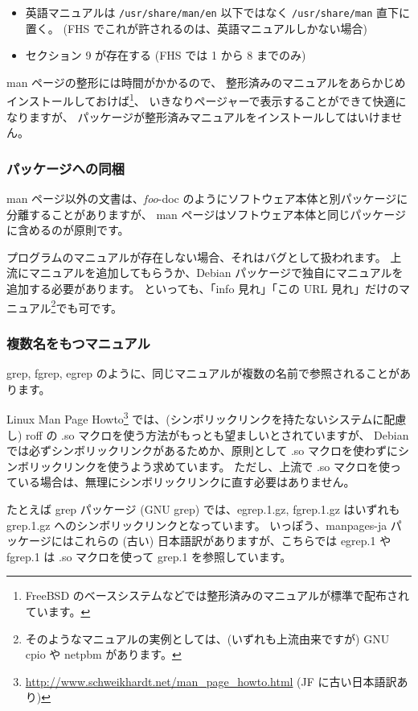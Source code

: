 \documentclass[mingoth,a4paper]{jsarticle}
\begin{document}
\begin{itemize}
\item 英語マニュアルは {\tt /usr/share/man/en} 以下ではなく {\tt /usr/share/man} 直下に置く。
(FHS でこれが許されるのは、英語マニュアルしかない場合)
\item セクション 9 が存在する
(FHS では 1 から 8 までのみ)
\end{itemize}

man ページの整形には時間がかかるので、
整形済みのマニュアルをあらかじめインストールしておけば\footnote{FreeBSD のベースシステムなどでは整形済みのマニュアルが標準で配布されています。}、
いきなりページャーで表示することができて快適になりますが、
パッケージが整形済みマニュアルをインストールしてはいけません。

\subsubsection{パッケージへの同梱}
man ページ以外の文書は、{\it foo}-doc のようにソフトウェア本体と別パッケージに分離することがありますが、
man ページはソフトウェア本体と同じパッケージに含めるのが原則です。

プログラムのマニュアルが存在しない場合、それはバグとして扱われます。
上流にマニュアルを追加してもらうか、Debian パッケージで独自にマニュアルを追加する必要があります。
といっても、「info 見れ」「この URL 見れ」だけのマニュアル\footnote{そのようなマニュアルの実例としては、(いずれも上流由来ですが) GNU cpio や netpbm があります。}でも可です。

\subsubsection{複数名をもつマニュアル}

grep, fgrep, egrep のように、同じマニュアルが複数の名前で参照されることがあります。

Linux Man Page Howto\footnote{\url{ http://www.schweikhardt.net/man_page_howto.html} (JF に古い日本語訳あり)}
では、(シンボリックリンクを持たないシステムに配慮し) roff の .so マクロを使う方法がもっとも望ましいとされていますが、
Debian では必ずシンボリックリンクがあるためか、原則として .so マクロを使わずにシンボリックリンクを使うよう求めています。
ただし、上流で .so マクロを使っている場合は、無理にシンボリックリンクに直す必要はありません。

たとえば grep パッケージ (GNU grep) では、egrep.1.gz, fgrep.1.gz はいずれも grep.1.gz へのシンボリックリンクとなっています。
いっぽう、manpages-ja パッケージにはこれらの (古い) 日本語訳がありますが、こちらでは egrep.1 や fgrep.1 は .so マクロを使って grep.1 を参照しています。
\end{document}
